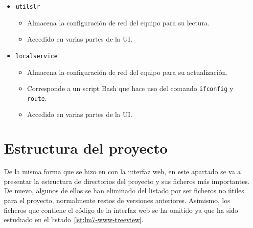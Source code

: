\begin{itemize}
    \item \verb|utilslr|
    \begin{itemize}
        \item Almacena la configuración de red del equipo para su lectura.
        \item Accedido en varias partes de la UI.
    \end{itemize}

    \item \verb|localservice|
    \begin{itemize}
        \item Almacena la configuración de red del equipo para su actualización.
        \item Corresponde a un script Bash que hace uso del comando \verb|ifconfig| y \verb|route|.
        \item Accedido en varias partes de la UI.
    \end{itemize}
\end{itemize}

\section{Estructura del proyecto}

De la misma forma que se hizo en con la interfaz web, en este apartado se va a presentar la estructura de directorios del proyecto y sus ficheros más importantes. De nuevo, algunos de ellos se han eliminado del listado por ser ficheros no útiles para el proyecto, normalmente restos de versiones anteriores. Asimismo, los ficheros que contiene el código de la interfaz web se ha omitido ya que ha sido estudiado en el listado \ref{lst:lm7-www-treeview}. \\

